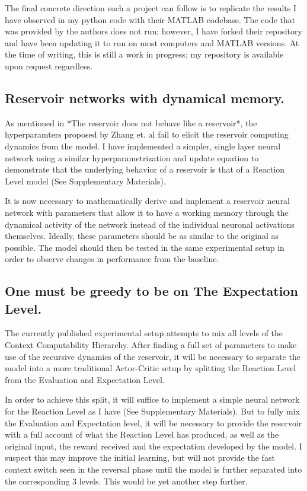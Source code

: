 \documentclass[]{article}
\begin{document}
The final concrete direction such a project can follow is to replicate the results I have observed in my python code with their MATLAB codebase.  The code that was provided by the authors does not run; however, I have forked their repository and have been updating it to run on most computers and MATLAB versions.  At the time of writing, this is still a work in progress; my repository is available upon request regardless.

\subsection{Reservoir networks with dynamical memory.}
As mentioned in *The reservoir does not behave like a reservoir*, the hyperparamters proposed by Zhang et. al fail to elicit the reservoir computing dynamics from the model.  I have implemented a simpler, single layer neural network using a similar hyperparametrization and update equation to demonstrate that the underlying behavior of a reservoir is that of a Reaction Level model (See Supplementary Materials).

It is now necessary to mathematically derive and implement a reservoir neural network with parameters that allow it to have a working memory through the dynamical activity of the network instead of the individual neuronal activations themselves.  Ideally, these parameters should be as similar to the original as possible.  The model should then be tested in the same experimental setup in order to observe changes in performance from the baseline.

\subsection{One must be greedy to be on The Expectation Level.}
The currently published experimental setup attempts to mix all levels of the Context Computability Hierarchy.  After finding a full set of parameters to make use of the recursive dynamics of the reservoir, it will be necessary to separate the model into a more traditional Actor-Critic setup by splitting the Reaction Level from the Evaluation and Expectation Level.

In order to achieve this split, it will suffice to implement a simple neural network for the Reaction Level as I have (See Supplementary Materials).  But to fully mix the Evaluation and Expectation level, it will be necessary to provide the reservoir with a full account of what the Reaction Level has produced, as well as the original input, the reward received and the expectation developed by the model.  I suspect this may improve the initial learning, but will not provide the fast context switch seen in the reversal phase until the model is further separated into the corresponding 3 levels.  This would be yet another step further.
\end{document}
